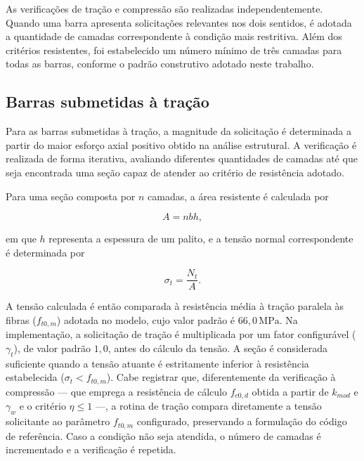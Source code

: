 As verificações de tração e compressão são realizadas independentemente. Quando uma barra apresenta solicitações relevantes nos dois sentidos, é adotada a quantidade de camadas correspondente à condição mais restritiva. Além dos critérios resistentes, foi estabelecido um número mínimo de três camadas para todas as barras, conforme o padrão construtivo adotado neste trabalho.

\subsection{Barras submetidas à tração}
\label{subsec:metodologia-tracao}

Para as barras submetidas à tração, a magnitude da solicitação é determinada a partir do maior esforço axial positivo obtido na análise estrutural. A verificação é realizada de forma iterativa, avaliando diferentes quantidades de camadas até que seja encontrada uma seção capaz de atender ao critério de resistência adotado.

Para uma seção composta por \(n\) camadas, a área resistente é calculada por

\begin{equation}
    A = nbh,
\end{equation}

em que \(h\) representa a espessura de um palito, e a tensão normal correspondente é determinada por

\begin{equation}
    \sigma_t = \frac{N_t}{A}.
\end{equation}

A tensão calculada é então comparada à resistência média à tração paralela às fibras (\(f_{t0,m}\)) adotada no modelo, cujo valor padrão é \(66,0\,\mathrm{MPa}\). Na implementação, a solicitação de tração é multiplicada por um fator configurável (\(\gamma_t\)), de valor padrão \(1,0\), antes do cálculo da tensão. A seção é considerada suficiente quando a tensão atuante é estritamente inferior à resistência estabelecida (\(\sigma_t < f_{t0,m}\)). Cabe registrar que, diferentemente da verificação à compressão — que emprega a resistência de cálculo \(f_{c0,d}\) obtida a partir de \(k_{mod}\) e \(\gamma_w\) e o critério \(\eta \leq 1\) —, a rotina de tração compara diretamente a tensão solicitante ao parâmetro \(f_{t0,m}\) configurado, preservando a formulação do código de referência. Caso a condição não seja atendida, o número de camadas é incrementado e a verificação é repetida.

